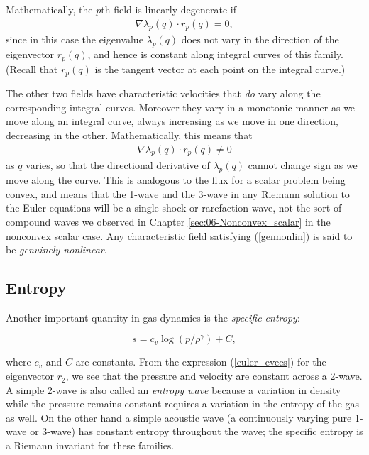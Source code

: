 \documentclass{SIAMbook2016}
\begin{document}
Mathematically, the \(p\)th field is linearly degenerate if
\begin{align}\label{lindegen}
\nabla \lambda_p(q) \cdot r_p(q) = 0,
\end{align} since in this case the eigenvalue \(\lambda_p(q)\) does not
vary in the direction of the eigenvector \(r_p(q)\), and hence is
constant along integral curves of this family. (Recall that \(r_p(q)\)
is the tangent vector at each point on the integral curve.)

The other two fields have characteristic velocities that \emph{do} vary
along the corresponding integral curves. Moreover they vary in a
monotonic manner as we move along an integral curve, always increasing
as we move in one direction, decreasing in the other. Mathematically,
this means that \begin{align}\label{gennonlin}
\nabla \lambda_p(q) \cdot r_p(q) \ne 0
\end{align} as \(q\) varies, so that the directional derivative of
\(\lambda_p(q)\) cannot change sign as we move along the curve. This is
analogous to the flux for a scalar problem being convex, and means that
the 1-wave and the 3-wave in any Riemann solution to the Euler equations
will be a single shock or rarefaction wave, not the sort of compound
waves we observed in Chapter \ref{sec:06-Nonconvex_scalar} in the
nonconvex scalar case. Any characteristic field satisfying
(\ref{gennonlin}) is said to be \emph{genuinely nonlinear}.

\hypertarget{entropy}{%
\subsection{Entropy}\label{entropy}}

Another important quantity in gas dynamics is the \emph{specific
entropy}:

\[ s = c_v \log(p/\rho^\gamma) + C,\]

where \(c_v\) and \(C\) are constants. From the expression
(\ref{euler_evecs}) for the eigenvector \(r_2\), we see that the
pressure and velocity are constant across a 2-wave. A simple 2-wave is
also called an \emph{entropy wave} because a variation in density while
the pressure remains constant requires a variation in the entropy of the
gas as well. On the other hand a simple acoustic wave (a continuously
varying pure 1-wave or 3-wave) has constant entropy throughout the wave;
the specific entropy is a Riemann invariant for these families.
\end{document}

